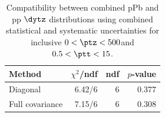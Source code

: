 \begin{table}[htp!]
\centering
\begin{tabular}{|l|r|r|r|}
\hline
Method & $\chi^2$/ndf & ndf & $p$-value \\
\hline
Diagonal & 6.42/6 & 6 & 0.377 \\
Full covariance & 7.15/6 & 6 & 0.308 \\
\hline
\end{tabular}
\caption{Compatibility between combined pPb and pp $\dytz$ distributions using combined statistical and systematic uncertainties for inclusive $0 < \ptz < 500$\GeV and $0.5 < \ptt < 15$\GeV.}
\label{table:chisq_deta}
\end{table}

